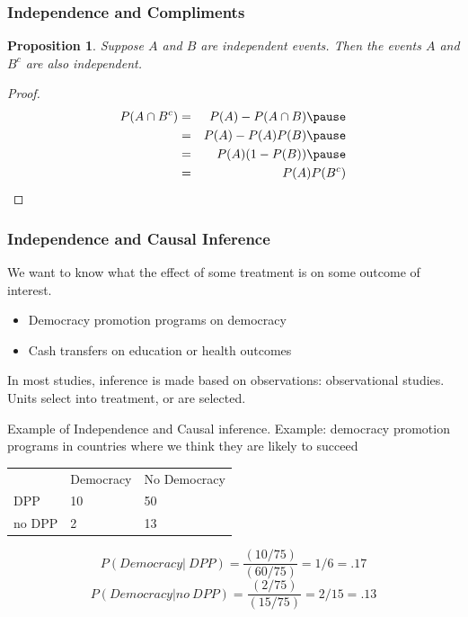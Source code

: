 \documentclass[handout]{beamer}
\newtheorem{prop}{Proposition}
\numberwithin{equation}{section}
\begin{document}
\begin{frame}
\frametitle{Independence and Compliments}

\begin{prop}
Suppose $A$ and $B$ are independent events. Then the events $A$ and $B^{c}$ are also independent.  
\end{prop}

\pause 

\begin{proof}
\begin{eqnarray}
P(A \cap B^{c} ) & = & P(A) - P(A \cap B) \nonumber  \pause \\
& = & P(A)  - P(A) P(B) \nonumber  \pause \\
& = & P(A) ( 1- P(B) )  \pause \nonumber \\
& = & P(A) P(B^{c})   \nonumber 
\end{eqnarray}
\end{proof}



\end{frame}


\begin{frame}
\frametitle{Independence and Causal Inference}
 We want to know what the effect of some treatment is on some outcome of interest.\pause
 \begin{itemize}
\item Democracy promotion programs on democracy \pause
\item Cash transfers on education or health outcomes \pause
\end{itemize}
In most studies, inference is made based on observations: observational studies. Units select into treatment, or are selected. \pause
\end{frame}




\begin{frame}{Example of Independence and Causal inference.}
Example: democracy promotion programs in countries where we think they are likely to succeed\pause

\begin{table}
\begin{tabular}{lll}
		&Democracy& No Democracy\\
DPP &10 & 50\\
no DPP & 2& 13\\

\end{tabular}
\end{table}
\pause
$$P(Democracy|\ DPP)= \frac{(10/75)}{(60/75)} =1/6= .17$$
$$P(Democracy| no\ DPP)=  \frac{(2 /75)}{(15/75)} = 2/15=.13$$

 \end{frame}
\end{document}
